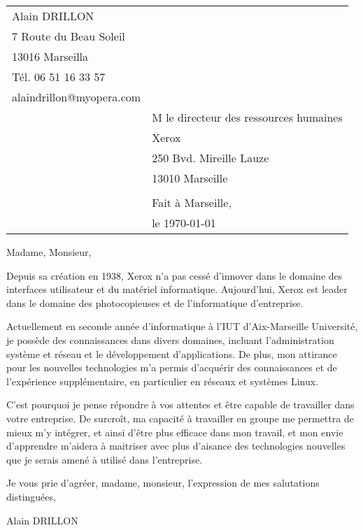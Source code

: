 \documentclass[11pt]{article}
\begin{document}
    \thispagestyle{empty}
    \begin{tabular}{p{10cm}p{10cm}}
        Alain DRILLON \\ 
        7 Route du Beau Soleil \\
        13016 Marseilla \\
        Tél. 06 51 16 33 57\\
        alaindrillon@myopera.com\\
        & M le directeur des ressources humaines\\
        & Xerox\\
        & 250 Bvd. Mireille Lauze\\
        & 13010 Marseille \\
        & \\
        & Fait à Marseille,\\
        & le \today\\
    \end{tabular}

    \vspace{2cm}

    Madame, Monsieur,
    \vspace{0.75cm}

    Depuis sa création en 1938, Xerox n'a pas cessé d'innover dans le domaine des interfaces utilisateur et du matériel informatique. Aujourd'hui, Xerox est leader dans le domaine des photocopieuses et de l'informatique d'entreprise.

    \vspace{0.75cm}
    Actuellement en seconde année d'informatique à l'IUT d'Aix-Marseille Université, je possède des connaissances dans divers domaines, incluant l'administration système et réseau et le développement d'applications.
    De plus, mon attirance pour les nouvelles technologies m'a permis d’acquérir des connaissances et de l'expérience supplémentaire, en particulier en réseaux et systèmes Linux.
   
   C'est pourquoi je pense répondre à vos attentes et être capable de travailler dans votre entreprise. De surcroît, ma capacité à travailler en groupe me permettra de mieux m'y intégrer, et ainsi d'être plus efficace dans mon travail, et mon envie d'apprendre m'aidera à maitriser avec plus d'aisance des technologies nouvelles que je serais amené à utilisé dans l'entreprise.

   \vspace{0.50cm}
   Je vous prie d'agréer, madame, monsieur, l'expression de mes salutations distinguées,

   \vspace{0.50cm}
   Alain DRILLON
\end{document}
